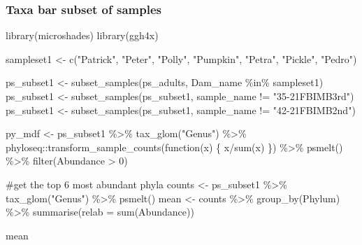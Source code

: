 \documentclass[
  letterpaper,
  DIV=11,
  numbers=noendperiod]{scrartcl}
\newenvironment{Shaded}{\begin{snugshade}}{\end{snugshade}}
\newcommand{\AttributeTok}[1]{\textcolor[rgb]{0.40,0.45,0.13}{#1}}
\newcommand{\CommentTok}[1]{\textcolor[rgb]{0.37,0.37,0.37}{#1}}
\newcommand{\ControlFlowTok}[1]{\textcolor[rgb]{0.00,0.23,0.31}{#1}}
\newcommand{\DecValTok}[1]{\textcolor[rgb]{0.68,0.00,0.00}{#1}}
\newcommand{\FunctionTok}[1]{\textcolor[rgb]{0.28,0.35,0.67}{#1}}
\newcommand{\NormalTok}[1]{\textcolor[rgb]{0.00,0.23,0.31}{#1}}
\newcommand{\OtherTok}[1]{\textcolor[rgb]{0.00,0.23,0.31}{#1}}
\newcommand{\SpecialCharTok}[1]{\textcolor[rgb]{0.37,0.37,0.37}{#1}}
\newcommand{\StringTok}[1]{\textcolor[rgb]{0.13,0.47,0.30}{#1}}
\begin{document}
\subsubsection{Taxa bar subset of
samples}\label{taxa-bar-subset-of-samples}

\begin{Shaded}
\begin{Highlighting}[]
\FunctionTok{library}\NormalTok{(microshades)}
\FunctionTok{library}\NormalTok{(ggh4x)}

\NormalTok{sampleset1 }\OtherTok{\textless{}{-}} \FunctionTok{c}\NormalTok{(}\StringTok{"Patrick"}\NormalTok{, }\StringTok{"Peter"}\NormalTok{, }\StringTok{"Polly"}\NormalTok{, }\StringTok{"Pumpkin"}\NormalTok{,}
                \StringTok{"Petra"}\NormalTok{, }\StringTok{"Pickle"}\NormalTok{, }\StringTok{"Pedro"}\NormalTok{)}

\NormalTok{ps\_subset1 }\OtherTok{\textless{}{-}} \FunctionTok{subset\_samples}\NormalTok{(ps\_adults, }
\NormalTok{                             Dam\_name }\SpecialCharTok{\%in\%}\NormalTok{ sampleset1)}
\NormalTok{ps\_subset1 }\OtherTok{\textless{}{-}} \FunctionTok{subset\_samples}\NormalTok{(ps\_subset1, }
\NormalTok{                             sample\_name }\SpecialCharTok{!=} \StringTok{"35{-}21FBIMB3rd"}\NormalTok{)}
\NormalTok{ps\_subset1 }\OtherTok{\textless{}{-}} \FunctionTok{subset\_samples}\NormalTok{(ps\_subset1, }
\NormalTok{                             sample\_name }\SpecialCharTok{!=} \StringTok{"42{-}21FBIMB2nd"}\NormalTok{)}



\NormalTok{py\_mdf }\OtherTok{\textless{}{-}}\NormalTok{ ps\_subset1 }\SpecialCharTok{\%\textgreater{}\%}
  \FunctionTok{tax\_glom}\NormalTok{(}\StringTok{"Genus"}\NormalTok{) }\SpecialCharTok{\%\textgreater{}\%}
\NormalTok{  phyloseq}\SpecialCharTok{::}\FunctionTok{transform\_sample\_counts}\NormalTok{(}\ControlFlowTok{function}\NormalTok{(x) \{ x}\SpecialCharTok{/}\FunctionTok{sum}\NormalTok{(x) \}) }\SpecialCharTok{\%\textgreater{}\%}
  \FunctionTok{psmelt}\NormalTok{() }\SpecialCharTok{\%\textgreater{}\%}
  \FunctionTok{filter}\NormalTok{(Abundance }\SpecialCharTok{\textgreater{}} \DecValTok{0}\NormalTok{)}

\CommentTok{\#get the top 6 most abundant phyla}
\NormalTok{counts }\OtherTok{\textless{}{-}}\NormalTok{ ps\_subset1 }\SpecialCharTok{\%\textgreater{}\%}
  \FunctionTok{tax\_glom}\NormalTok{(}\StringTok{"Genus"}\NormalTok{) }\SpecialCharTok{\%\textgreater{}\%}
  \FunctionTok{psmelt}\NormalTok{()}
\NormalTok{mean }\OtherTok{\textless{}{-}}\NormalTok{ counts }\SpecialCharTok{\%\textgreater{}\%}
  \FunctionTok{group\_by}\NormalTok{(Phylum) }\SpecialCharTok{\%\textgreater{}\%}
  \FunctionTok{summarise}\NormalTok{(}\AttributeTok{relab =} \FunctionTok{sum}\NormalTok{(Abundance))}

\NormalTok{mean}
\end{Highlighting}
\end{Shaded}
\end{document}

